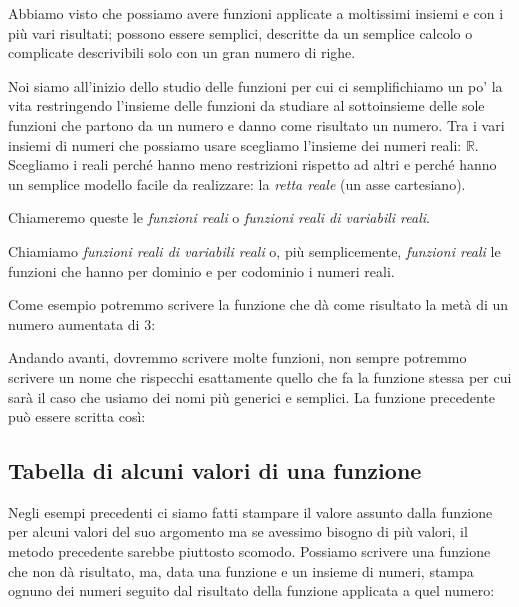 Abbiamo visto che possiamo avere funzioni applicate a moltissimi insiemi e 
con i più vari risultati; possono essere semplici, descritte da un semplice 
calcolo o complicate descrivibili solo con un gran numero di righe.

Noi siamo all'inizio dello studio delle funzioni per cui ci 
semplifichiamo un po' la vita restringendo l'insieme delle funzioni da 
studiare al sottoinsieme delle sole funzioni che partono da un numero e 
danno come risultato un numero. 
Tra i vari insiemi di numeri che possiamo usare scegliamo l'insieme dei 
numeri reali: $\mathbb{R}$. Scegliamo i reali perché hanno meno restrizioni 
rispetto ad altri e perché hanno un semplice modello facile da realizzare: 
la \emph{retta reale} (un asse cartesiano).

Chiameremo queste le \emph{funzioni reali} o 
\emph{funzioni reali di variabili reali}.

\begin{definizione}
Chiamiamo \emph{funzioni reali di variabili reali} o, più 
semplicemente, \emph{funzioni reali} le funzioni che hanno per dominio e 
per codominio i numeri reali.
\end{definizione}

\begin{esempio}
Come esempio potremmo scrivere la funzione che dà come risultato la metà di 
un numero aumentata di 3:


\end{esempio}

Andando avanti, dovremmo scrivere molte funzioni, non sempre potremmo 
scrivere un nome che rispecchi esattamente quello che fa la funzione stessa 
per cui sarà il caso che usiamo dei nomi più generici e semplici. 
La funzione precedente può essere scritta così:


\subsection{Tabella di alcuni valori di una funzione}

Negli esempi precedenti ci siamo fatti stampare il valore assunto dalla 
funzione per alcuni valori del suo argomento ma se avessimo bisogno di più 
valori, il metodo precedente sarebbe piuttosto scomodo. Possiamo scrivere 
una funzione che non dà risultato, ma, data una funzione e un insieme di 
numeri, stampa ognuno dei numeri seguito dal risultato della funzione 
applicata a quel numero:

